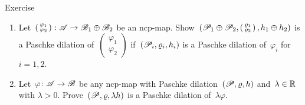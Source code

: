 \documentclass[b]{subfiles}
\begin{document}
\begin{parsec}
\begin{point}{Exercise}
\begin{enumerate}
\item
    Let~$ \left(\begin{smallmatrix} \varphi_1 \\ \varphi_2
    \end{smallmatrix}\right) \colon \mathscr{A} \to \mathscr{B}_1 \oplus \mathscr{B}_2$
    be an ncp-map.
Show~$(\mathscr{P}_1 \oplus \mathscr{P}_2,
        \left(\begin{smallmatrix} \varrho_1 \\ \varrho_2 \end{smallmatrix}\right),
        h_1 \oplus h_2)$
        is a Paschke dilation of~$\left(\begin{smallmatrix} \varphi_1 \\ \varphi_2 
        \end{smallmatrix}\right)$
    if~$(\mathscr{P}_i, \varrho_i, h_i)$
    is a Paschke dilation of~$\varphi_i$ for~$i=1,2$.
\item
Let~$\varphi\colon \mathscr{A} \to \mathscr{B}$
    be any ncp-map with Paschke dilation~$(\mathscr{P}, \varrho, h)$
    and~$\lambda \in \mathbb{R}$ with $\lambda > 0$.
Prove~$(\mathscr{P}, \varrho, \lambda h)$
    is a Paschke dilation of~$\lambda \varphi$.
\end{enumerate}
\end{point}
\end{parsec}
\end{document}
